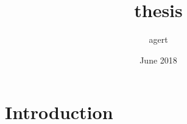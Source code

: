 \documentclass{article}
\title{thesis}
\author{agert }
\date{June 2018}
\begin{document}
\maketitle

\section{Introduction}




\end{document}
